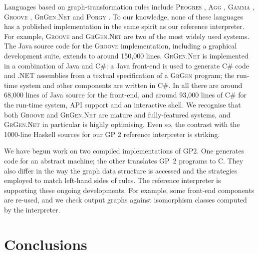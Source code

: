 Languages based on graph-transformation rules include
\textsc{Progres} \cite{Schuerr-Winter-Zuendorf99a},
\textsc{Agg} \cite{Ermel-Rudolf-Taentzer99a,Runge-Ermel-Taentzer11a},
\textsc{Gamma} \cite{Fradet-LeMetayer98a},
\textsc{Groove} \cite{Ghamarian-deMol-Rensink-Zambon-Zimakova12a},
\textsc{GrGen.Net} \cite{Jakumeit-Buchwald-Kroll10a} and
\textsc{Porgy} \cite{Fernandez-Kirchner-Mackie-Pinaud14a}.
To our knowledge, none of these languages has a published implementation in the same spirit as our reference interpreter. For example, \textsc{Groove} and \textsc{GrGen.Net} are two of the most widely used systems. The Java source code for the \textsc{Groove} implementation, including a graphical development suite, extends to around 150,000 lines. \textsc{GrGen.Net} is implemented in a combination of Java and C\#: a Java front-end is used to generate C\# code and .NET assemblies from a textual specification of a \textsc{GrGen} program; the run-time system and other components are written in C\#. In all there are around 68,000 lines of Java source for the front-end, and around 93,000 lines of C\# for the run-time system, API support and an interactive shell.
We recognise that both \textsc{Groove} and \textsc{GrGen.Net} are mature and fully-featured systems, and \textsc{GrGen.Net} in particular is highly optimising. Even so, the contrast with the 1000-line Haskell sources for our GP 2 reference interpreter is striking.

We have begun work on two compiled implementations of GP2. One generates code for an abstract machine; the other translates GP~2 programs to C. They also differ in the way the graph data structure is accessed and the strategies employed to match left-hand sides of rules. The reference interpreter is supporting these ongoing developments. For example, some front-end components are re-used, and we check output graphs against isomorphism classes
computed by the interpreter.
\section{Conclusions}
\label{sec:conclusions}






